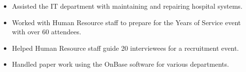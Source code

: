 \documentclass[10pt,letter]{altacv}
\begin{document}
\begin{itemize}
  \item Assisted the IT department with maintaining and repairing hospital systems.
  \item Worked with Human Resource staff to prepare for the Years of Service event with over 60 attendees.
  \item Helped Human Resource staff guide 20 interviewees for a recruitment event.
  \item Handled paper work using the OnBase software for various departments.
\end{itemize}






\end{document}
